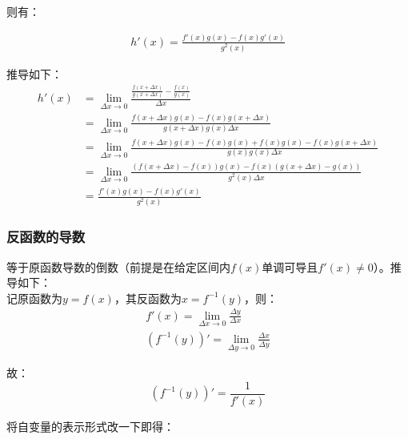 \documentclass[12pt]{article}
\begin{document}
则有：

\begin{equation*}
\begin{aligned}
h'(x) = \frac{f'(x)g(x) - f(x)g'(x)}{g^2(x)}
\end{aligned}
\end{equation*}

推导如下：\\

\begin{equation*}
\begin{aligned}
h'(x) & = \lim_{\Delta x \to 0}\frac{\frac{f(x + \Delta x)}{g(x + \Delta x)} - \frac{f(x)}{g(x)}}{\Delta x}\\
& = \lim_{\Delta x \to 0}\frac{f(x + \Delta x)g(x) - f(x)g(x + \Delta x)}{g(x + \Delta x)g(x)\Delta x}\\
& = \lim_{\Delta x \to 0}\frac{f(x + \Delta x)g(x) - f(x)g(x) + f(x)g(x) - f(x)g(x + \Delta x)}{g(x)g(x)\Delta x}\\
& = \lim_{\Delta x \to 0}\frac{(f(x + \Delta x)- f(x))g(x) - f(x)(g(x + \Delta x) - g(x))}{g^2(x)\Delta x}\\
& = \frac{f'(x)g(x) - f(x)g'(x)}{g^2(x)}
\end{aligned}
\end{equation*}

\subsubsection{反函数的导数}

等于原函数导数的倒数（前提是在给定区间内$f(x)$单调可导且$f'(x) \neq 0$）。推导如下：\\

记原函数为$y = f(x)$，其反函数为$x = f^{-1}(y)$，则：\\

\begin{equation*}
\begin{aligned}
f'(x) = \lim_{\Delta x \to 0}\frac{\Delta y}{\Delta x}\\
(f^{-1}(y))' = \lim_{\Delta y \to 0}\frac{\Delta x}{\Delta y}
\end{aligned}
\end{equation*}

故：\\

\begin{equation*}
(f^{-1}(y))' = \frac{1}{f'(x)}
\end{equation*}

将自变量的表示形式改一下即得：\\
\end{document}
